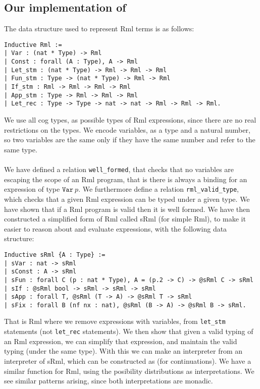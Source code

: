 \documentclass[11pt, leqno, titlepage]{article}
\newcommand{\wellformed}{\texttt{well\_formed}}
\newcommand{\valid}{\texttt{rml\_valid\_type}}
\theoremstyle{definition}
\begin{document}
\subsection{Our implementation of \rml}
The data structure used to represent Rml terms is as follows:
\begin{center}
  \begin{minipage}{0.7\linewidth}
    \begin{lstlisting}[language=coq]
Inductive Rml :=
| Var : (nat * Type) -> Rml
| Const : forall (A : Type), A -> Rml
| Let_stm : (nat * Type) -> Rml -> Rml -> Rml
| Fun_stm : Type -> (nat * Type) -> Rml -> Rml
| If_stm : Rml -> Rml -> Rml -> Rml
| App_stm : Type -> Rml -> Rml -> Rml
| Let_rec : Type -> Type -> nat -> nat -> Rml -> Rml -> Rml.
    \end{lstlisting}
  \end{minipage}
\end{center}
We use all cog types, as possible types of Rml expressions, since there are no real restrictions on the types. We encode variables, as a type and a natural number, so two variables are the same only if they have the same number and refer to the same type.
\\ \\
We have defined a relation \wellformed, that checks that no variables are escaping the scope of an Rml program, that is there is always a binding for an expression of type \(\mathtt{Var}~p\). We furthermore define a relation \valid, which checks that a given Rml expression can be typed under a given type. We have shown that if a Rml program is valid then it is well formed. We have then constructed a simplified form of Rml called sRml (for simple Rml), to make it easier to reason about and evaluate expressions, with the following data structure:
\begin{center}
  \begin{minipage}{0.7\linewidth}
    \begin{lstlisting}[language=coq]
Inductive sRml {A : Type} :=
| sVar : nat -> sRml
| sConst : A -> sRml
| sFun : forall C (p : nat * Type), A = (p.2 -> C) -> @sRml C -> sRml
| sIf : @sRml bool -> sRml -> sRml -> sRml
| sApp : forall T, @sRml (T -> A) -> @sRml T -> sRml
| sFix : forall B (nf nx : nat), @sRml (B -> A) -> @sRml B -> sRml.
    \end{lstlisting}
  \end{minipage}
\end{center}
That is Rml where we remove expressions with variables, from \texttt{let\_stm} statements (not \texttt{let\_rec} statements). We then show that given a valid typing of an Rml expression, we can simplify that expression, and maintain the valid typing (under the same type). With this we can make an interpreter from an interpreter of sRml, which can be constructed as (for continuations). We have a similar function for Rml, using the posibility distributions as interpretations. We see similar patterns arising, since both interpretations are monadic.
\end{document}
